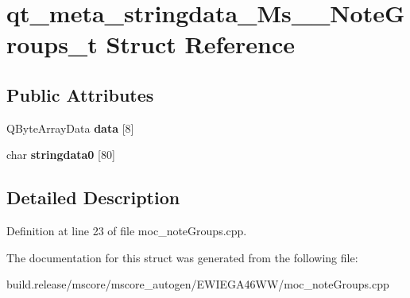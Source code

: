 \hypertarget{structqt__meta__stringdata___ms_____note_groups__t}{}\section{qt\+\_\+meta\+\_\+stringdata\+\_\+\+Ms\+\_\+\+\_\+\+Note\+Groups\+\_\+t Struct Reference}
\label{structqt__meta__stringdata___ms_____note_groups__t}
\subsection*{Public Attributes}
\begin{DoxyCompactItemize}
\item 
\mbox{\label{structqt__meta__stringdata___ms_____note_groups__t_a8ef3527618cad235665d7d3577441f17}} 
Q\+Byte\+Array\+Data {\bfseries data} \mbox{[}8\mbox{]}
\item 
\mbox{\label{structqt__meta__stringdata___ms_____note_groups__t_afda9eb1225b4927b582f22dbaf592e3b}} 
char {\bfseries stringdata0} \mbox{[}80\mbox{]}
\end{DoxyCompactItemize}


\subsection{Detailed Description}


Definition at line 23 of file moc\+\_\+note\+Groups.\+cpp.



The documentation for this struct was generated from the following file\+:\begin{DoxyCompactItemize}
\item 
build.\+release/mscore/mscore\+\_\+autogen/\+E\+W\+I\+E\+G\+A46\+W\+W/moc\+\_\+note\+Groups.\+cpp\end{DoxyCompactItemize}
